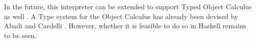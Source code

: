 \documentclass[10pt,twocolumn]{article}
\begin{document}
In the future, this interpreter can be extended to support Typed Object Calculus as well \cite{ex5}. A Type system for the Object Calculus has already been devised by Abadi and Cardelli \cite{ex11}. However, whether it is feasible to do so in Haskell remains to be seen. 




\end{document}
